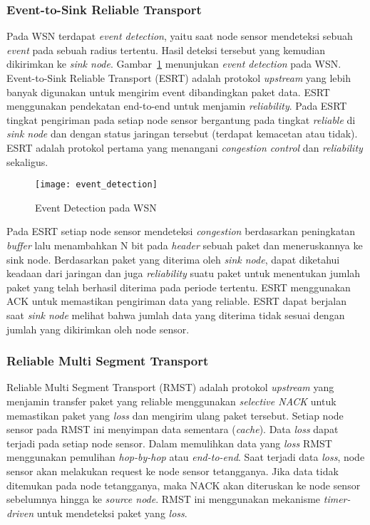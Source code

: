 \subsubsection{Event-to-Sink Reliable Transport \cite{esrt}}
Pada WSN terdapat \textit{event detection}, yaitu saat node sensor mendeteksi sebuah \textit{event} pada sebuah radius tertentu. Hasil deteksi tersebut yang kemudian dikirimkan ke \textit{sink node}. Gambar~\ref{fig:event_detection} menunjukan \textit{event detection} pada WSN. Event-to-Sink Reliable Transport (ESRT) adalah protokol \textit{upstream} yang lebih banyak digunakan untuk mengirim event dibandingkan paket data. ESRT menggunakan pendekatan end-to-end untuk menjamin \textit{reliability}. Pada ESRT tingkat pengiriman pada setiap node sensor bergantung pada tingkat \textit{reliable} di \textit{sink node} dan dengan status jaringan tersebut (terdapat kemacetan atau tidak). ESRT adalah protokol pertama yang menangani \textit{congestion control} dan \textit{reliability} sekaligus. 

\begin{figure} [H]
	\centering  
	\texttt{[image: event\_detection]}  
	\caption[Event Detection pada WSN]{Event Detection pada WSN} 
	\label{fig:event_detection} 
\end{figure}

Pada ESRT setiap node sensor mendeteksi \textit{congestion} berdasarkan peningkatan \textit{buffer} lalu menambahkan N bit pada \textit{header} sebuah paket dan meneruskannya ke sink node. Berdasarkan paket yang diterima oleh \textit{sink node}, dapat diketahui keadaan dari jaringan dan juga \textit{reliability} suatu paket untuk menentukan jumlah paket yang telah berhasil diterima pada periode tertentu. ESRT menggunakan ACK untuk memastikan pengiriman data yang reliable. ESRT dapat berjalan saat \textit{sink node} melihat bahwa jumlah data yang diterima tidak sesuai dengan jumlah yang dikirimkan oleh node sensor.

\subsubsection{Reliable Multi Segment Transport \cite{rmst}}
Reliable Multi Segment Transport (RMST) adalah protokol \textit{upstream} yang menjamin transfer paket yang reliable menggunakan \textit{selective NACK} untuk memastikan paket yang \textit{loss} dan mengirim ulang paket tersebut. Setiap node sensor pada RMST ini menyimpan data sementara (\textit{cache}). Data \textit{loss} dapat terjadi pada setiap node sensor. Dalam memulihkan data yang \textit{loss} RMST menggunakan pemulihan \textit{hop-by-hop} atau \textit{end-to-end}. Saat terjadi data \textit{loss}, node sensor akan melakukan request ke node sensor tetangganya. Jika data tidak ditemukan pada node tetangganya, maka NACK akan diteruskan ke node sensor sebelumnya hingga ke \textit{source node}. RMST ini menggunakan mekanisme \textit{timer-driven} untuk mendeteksi paket yang \textit{loss}. 

